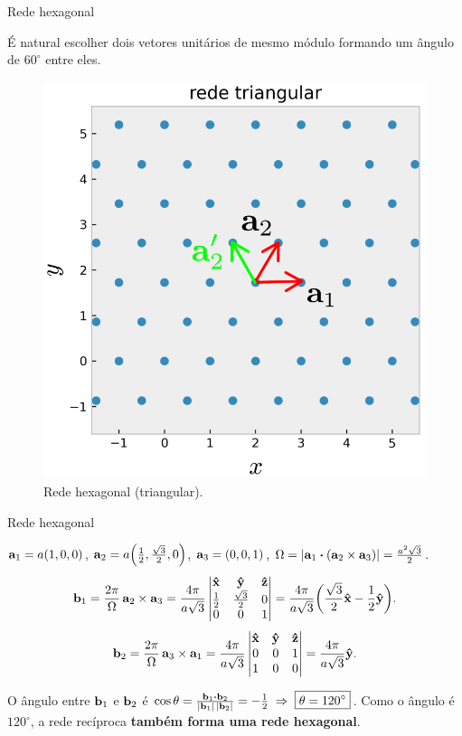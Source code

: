 \documentclass[aspectratio=169]{beamer}
\begin{document}


\begin{frame}{Rede hexagonal}

É natural escolher dois vetores unitários de mesmo módulo formando um ângulo de $60^\circ$ entre eles.

\begin{figure}[H]
\centering
\includegraphics[width=0.38\linewidth]{fig/lattice_triang.png}
\caption{Rede hexagonal (triangular).}
\label{fig:lat-triang}
\end{figure}

\end{frame}




\begin{frame}{Rede hexagonal}

$\vb{a}_1 = a(1,0,0)$, $\vb{a}_2 = a\qty(\frac{1}{2},\frac{\sqrt{3}}{2},0)$, $\vb{a}_3 = (0,0,1)$, $\Omega = \abs{\a_1 \vdot (\a_2 \times \a_3)} = \frac{a^2 \sqrt{3}}{2}$.
$$
\vb{b}_1 = \frac{2\pi}{\Omega} \, \vb{a}_2 \times \vb{a}_3 =
\frac{4\pi}{a \sqrt{3}}
\begin{vmatrix}
\vu{x} & \vu{y} & \vu{z} \\
\frac{1}{2} & \frac{\sqrt{3}}{2} & 0 \\
0 & 0 & 1 \\
\end{vmatrix}
=
\frac{4\pi}{a \sqrt{3}} \qty(\frac{\sqrt{3}}{2} \vu{x} - \frac{1}{2} \vu{y}).
$$
$$
\vb{b}_2 = \frac{2\pi}{\Omega} \, \vb{a}_3 \times \vb{a}_1 =
\frac{4\pi}{a \sqrt{3}}
\begin{vmatrix}
\vu{x} & \vu{y} & \vu{z} \\
0 & 0 & 1 \\
1 & 0 & 0 \\
\end{vmatrix}
= \frac{4\pi}{a\sqrt{3}} \vu{y}.
$$

\n

O ângulo entre $\vb{b}_1$ e $\vb{b}_2$ é $\cos\theta = \frac{\b_1 \vdot \b_2}{\abs{\b_1}\,\abs{\b_2}} = -\frac{1}{2} \implies \boxed{\theta = 120^\circ}$. Como o ângulo é $120^\circ$, a rede recíproca \textbf{também forma uma rede hexagonal}.

\end{frame}
\end{document}
